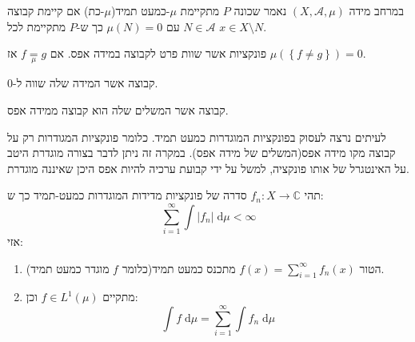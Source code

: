 \documentclass{tstextbook}
\begin{document}
\begin{definition}
במרחב מידה \(\left( X,\mathcal{A},\mu \right)\) נאמר שכונה \(P\) מתקיימת \(\mu\)-כמעט תמיד(\(\mu\)-כת) אם קיימת קבוצה \(N \in \mathcal{A}\) עם \(\mu(N)=0\) כך ש-\(P\) מתקיימת לכל \(x \in X\setminus N\).

\end{definition}
\begin{definition}
פונקציות אשר שוות פרט לקבוצה במידה אפס. אם \(f \underset{\mu}{=} g\) אז \(\mu\left( \left\{  f\neq g  \right\} \right)=0\).

\end{definition}
\begin{definition}
קבוצה אשר המידה שלה שווה ל-0.

\end{definition}
\begin{definition}
קבוצה אשר המשלים שלה הוא קבוצה ממידה אפס.

\end{definition}
\begin{remark}
לעיתים נרצה לעסוק בפונקציות המוגדרות כמעט תמיד. כלומר פונקציות המגודרות רק על קבוצה מקו מידה אפס(המשלים של מידה אפס). במקרה זה ניתן לדבר בצורה מוגדרת היטב על האינטגרל של אותו פונקציה, למשל על ידי קבועת ערכיה להיות אפס היכן שאיננה מוגדרת.

\end{remark}
\begin{proposition}
תהי \(f_{n}:X\to \mathbb{C}\) סדרה של פונקציות מדידות המוגדרות כמעט-תמיד כך ש:
$$\sum_{i=1}^{\infty} \int  \lvert f_{n} \rvert  \;\mathrm{d} \mu < \infty $$
אזי:

  \begin{enumerate}
    \item הטור \(f(x)=\sum_{i=1}^{\infty} f_{n}(x)\) מתכנס כמעט תמיד(כלומר \(f\) מוגדר כמעט תמיד). 


    \item מתקיים \(f\in L^{1}\left( \mu \right)\) וכן: 
$$\int f \;\mathrm{d} \mu = \sum_{i=1}^{\infty} \int f_{n} \;\mathrm{d} \mu  $$


  \end{enumerate}
\end{proposition}
\end{document}
